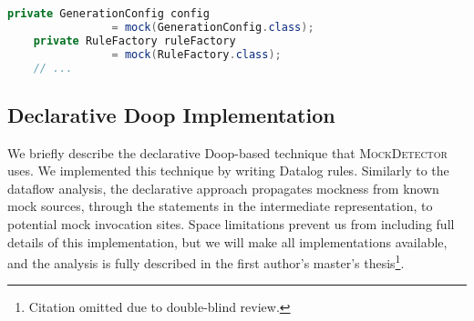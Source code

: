     

\begin{lstlisting}[basicstyle=\ttfamily, caption={Example for field mocks defined by field initializations \\ from \texttt{TypeRuleTest.java} in jsonschema2pojo.},
basicstyle=\scriptsize\ttfamily,language = Java, framesep=4.5mm,
framexleftmargin=1mm, captionpos=b, label=lis:fieldMock]
	private GenerationConfig config
                = mock(GenerationConfig.class);
	private RuleFactory ruleFactory
                = mock(RuleFactory.class);
    // ...
\end{lstlisting}

    

\subsection{Declarative Doop Implementation}
\label{sec:dec-doop}
We briefly describe the declarative Doop-based technique that \textsc{MockDetector} uses. We implemented this technique by writing Datalog rules. Similarly to the dataflow analysis, the declarative approach propagates mockness from known mock sources, through the statements in the intermediate representation, to potential mock invocation sites. Space limitations prevent us from including full details of this implementation, but we will make all implementations available, and the analysis is fully described in the first author's master's thesis\footnote{Citation omitted due to double-blind review.}.

